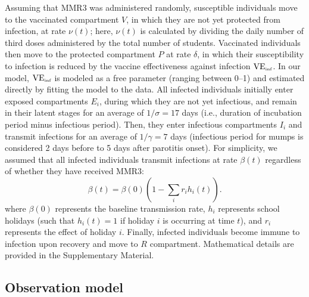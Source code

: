 \documentclass[12pt]{article}
\begin{document}
Assuming that MMR3 was administered randomly, susceptible individuals move to the vaccinated compartment $V$, in which they are not yet protected from infection, at rate $\nu(t)$; 
here, $\nu(t)$ is calculated by dividing the daily number of third doses administered by the total number of students.
Vaccinated individuals then move to the protected compartment $P$ at rate $\delta$, in which their susceptibility to infection is reduced by the vaccine effectiveness against infection $\mathrm{VE}_{\textrm{\tiny{inf}}}$.
In our model, $\mathrm{VE}_{\textrm{\tiny{inf}}}$ is modeled as a free parameter (ranging between 0--1) and estimated directly by fitting the model to the data.
All infected individuals initially enter exposed compartments $E_i$, during which they are not yet infectious, and remain in their latent stages for an average of $1/\sigma=17$ days (i.e., duration of incubation period minus infectious period).
Then, they enter infectious compartments $I_i$ and transmit infections for an average of $1/\gamma=7$ days (infectious period for mumps is considered 2 days before to 5 days after parotitis onset).
For simplicity, we assumed that all infected individuals transmit infections at rate $\beta(t)$ regardless of whether they have received MMR3:
\begin{equation}
\beta(t) = \beta(0) \left(1 - \sum_i r_i h_i(t)\right).
\label{eq:beta}
\end{equation}
where $\beta(0)$ represents the baseline transmission rate, $h_i$ represents school holidays (such that $h_i(t) = 1$ if holiday $i$ is occurring at time $t$), and $r_i$ represents the effect of holiday $i$.
Finally, infected individuals become immune to infection upon recovery and move to $R$ compartment.
Mathematical details are provided in the Supplementary Material.

\subsection{Observation model}
\end{document}
